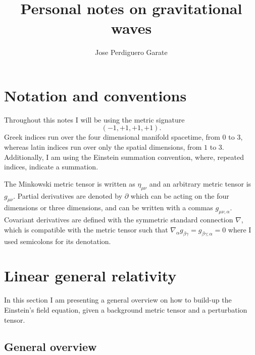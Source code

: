 \documentclass{article}
\title{Personal notes on gravitational waves}
\author{Jose Perdiguero Garate}
\begin{document}
\maketitle
\tableofcontents

\section*{Notation and conventions}

Throughout this notes I will be using the metric signature
\begin{equation}
    \left(-1, +1, +1, +1\right).
\end{equation}
Greek indices run over the four dimensional manifold spacetime, 
from $0$ to $3$, whereas latin indices run over only the spatial 
dimensions, from $1$ to $3$. Additionally, I am using the Einstein 
summation convention, where, repeated indices, indicate a summation.

The Minkowski metric tensor is written as $\eta_{\mu\nu}$ and 
an arbitrary metric tensor is $g_{\mu\nu}$. Partial derivatives 
are denoted by $\partial$ which can be acting on the four dimensions
or three dimensions, and can be written with a commas $g_{\mu\nu,\alpha}$. 
Covariant derivatives are defined with the symmetric standard connection
$\nabla$, which is compatible with the metric tensor such that 
$\nabla_{\alpha}g_{\beta\gamma} = g_{\beta\gamma;\alpha} = 0$
where I used semicolons for its denotation.

\section{Linear general relativity}

In this section I am presenting a general overview on how to build-up
the Einstein's field equation, given a background metric tensor and a 
perturbation tensor.

\subsection{General overview}
\end{document}
